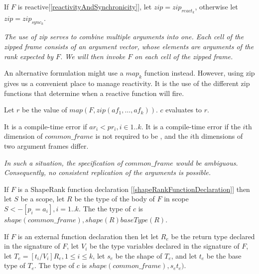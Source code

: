 \documentclass{article}
\begin{document}
If $F$ is reactive[\ref{reactivityAndSynchronicity}], let $zip = zip_{react_k}$, otherwise let $zip = zip_{sync_k}$.

{\em
The use of zip serves to combine multiple arguments into one.  
Each cell of the zipped frame consists of an argument vector, whose elements are arguments of the rank expected by $F$.
We will then invoke $F$ on each cell of the zipped frame.

An alternative formulation might use a $map_k$ function instead.
However, using zip gives us a convenient place to manage reactivity.
It is the use of the different zip functions that determine when a reactive function will fire. 
}

Let $r$ be the value of $map(F, zip(af_1, \ldots, af_k))$. $c$ evaluates to $r$.

It is a compile-time error if $ar_i < pr_i, i \in 1..k$. It is a compile-time error if the $i$th dimension of  $common\_frame$ is not required to be  \QUESTIONMARK{}, and the $i$th dimensions of two argument frames differ. 

{\em In such a situation, the specification of $common\_frame$ would be ambiguous. Consequently, no consistent replication of the arguments is possible.}

If $F$ is a ShapeRank function declaration [\ref{shapeRankFunctionDeclaration}] then
let $S$ be a scope, let $R$ be the type of the body of $F$ in scope $S <- [p_i = a_i], i = 1..k$. The the type of $c$ is
$shape(common\_frame), shape(R) baseType(R)$.


If $F$ is an external function declaration then let let $R_e$ be the return type declared in the signature of $F$,  let $V_i$ be the type variables declared in the signature of $F$, let 
$T_e = [t_i/V_i]R_e, 1 \le i \le k$, let $s_e$ be the shape of $T_e$, and let $t_e$ be the base type of $T_e$.
The type of $c$ is
$shape(common\_frame), s_e t_e)$.
\end{document}
